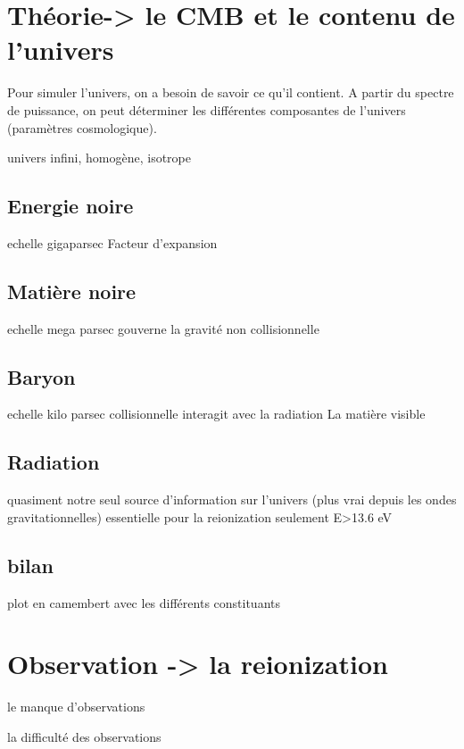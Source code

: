 \section{Théorie-> le CMB et le contenu de l'univers}

Pour simuler l'univers, on a besoin de savoir ce qu'il contient. 
A partir du spectre de puissance, on peut déterminer les différentes composantes de l'univers (paramètres cosmologique).

univers infini, homogène, isotrope

\subsection{Energie noire}

echelle gigaparsec
Facteur d'expansion

\subsection{Matière noire}

echelle mega parsec
gouverne la gravité
non collisionnelle

\subsection{Baryon}

echelle kilo parsec
collisionnelle
interagit avec la radiation
La matière visible

\subsection{Radiation}

quasiment notre seul source d'information sur l'univers (plus vrai depuis les ondes gravitationnelles)
essentielle pour la reionization
seulement E>13.6 eV

\subsection{bilan}

plot en camembert avec les différents constituants

\section{Observation -> la reionization}

le manque d'observations

la difficulté des observations

